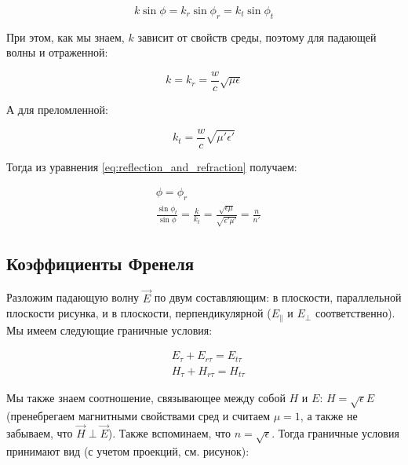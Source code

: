\begin{equation}
k\sin\phi = k_r \sin \phi_r = k_t \sin\phi_t
\label{eq:reflection_and_refraction}
\end{equation}

При этом, как мы знаем, $k$ зависит от свойств среды, поэтому для падающей волны и отраженной:

\begin{equation*}
k = k_r = \frac{w}{c} \sqrt{\mu \epsilon}
\end{equation*}

А для преломленной:

\begin{equation*}
k_t = \frac{w}{c} \sqrt{\mu'\epsilon'}
\end{equation*}

Тогда из уравнения \ref{eq:reflection_and_refraction} получаем:

\begin{align*}
&\phi = \phi_r\\
&\frac{\sin\phi_t}{\sin\phi} = \frac{k}{k_t} = \frac{\sqrt{\epsilon\mu}}{\sqrt{\epsilon'\mu'}} = \frac{n}{n'}
\end{align*}

\subsection{Коэффициенты Френеля}

Разложим падающую волну $\vec{E}$ по двум составляющим: в плоскости, параллельной плоскости рисунка, и в плоскости, перпендикулярной ($E_\parallel$ и $E_\perp$ соответственно). Мы имеем следующие граничные условия:

\begin{align*}
&E_\tau + E_{r\tau} = E_{t\tau}\\
&H_\tau + H_{r\tau} = H_{t\tau}
\end{align*}

Мы также знаем соотношение, связывающее между собой $H$ и $E$: $H = \sqrt{\epsilon}E$ (пренебрегаем магнитными свойствами сред и считаем $\mu = 1$, а также не забываем, что $\vec{H} \perp \vec{E}$). Также вспоминаем, что $n = \sqrt{\epsilon}$. Тогда граничные условия принимают вид (с учетом проекций, см. рисунок):

\begin{figure}[H]
	\centering
	\subfigure[]{\texttt{[image: 11\_1]}
	}
	\subfigure[]{
	\texttt{[image: 11\_2]}
}
\end{figure}

